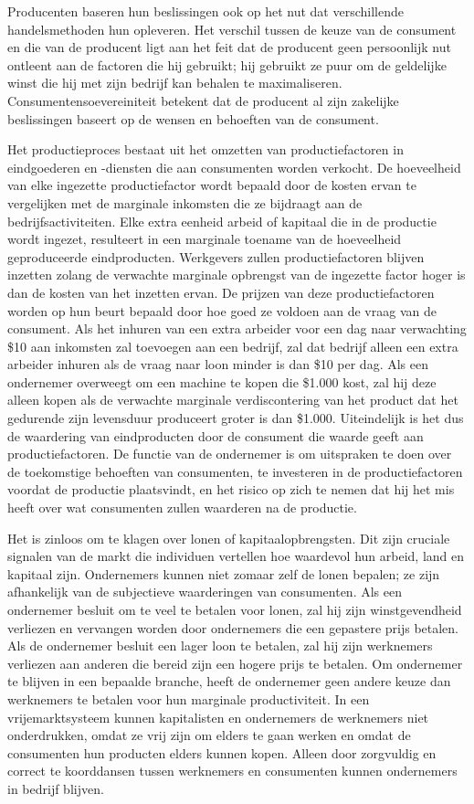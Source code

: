 \documentclass[
  a5paper,
  smalldemyvopaper,11pt,twoside,onecolumn,openright,extrafontsizes,
hidelinks]{memoir}
\begin{document}
Producenten baseren hun beslissingen ook op het nut dat verschillende
handelsmethoden hun opleveren. Het verschil tussen de keuze van de
consument en die van de producent ligt aan het feit dat de producent
geen persoonlijk nut ontleent aan de factoren die hij gebruikt; hij
gebruikt ze puur om de geldelijke winst die hij met zijn bedrijf kan
behalen te maximaliseren. Consumentensoevereiniteit betekent dat de
producent al zijn zakelijke beslissingen baseert op de wensen en
behoeften van de consument.

Het productieproces bestaat uit het omzetten van productiefactoren in
eindgoederen en -diensten die aan consumenten worden verkocht. De
hoeveelheid van elke ingezette productiefactor wordt bepaald door de
kosten ervan te vergelijken met de marginale inkomsten die ze bijdraagt
aan de bedrijfsactiviteiten. Elke extra eenheid arbeid of kapitaal die
in de productie wordt ingezet, resulteert in een marginale toename van
de hoeveelheid geproduceerde eindproducten. Werkgevers zullen
productiefactoren blijven inzetten zolang de verwachte marginale
opbrengst van de ingezette factor hoger is dan de kosten van het
inzetten ervan. De prijzen van deze productiefactoren worden op hun
beurt bepaald door hoe goed ze voldoen aan de vraag van de consument.
Als het inhuren van een extra arbeider voor een dag naar verwachting
\$10 aan inkomsten zal toevoegen aan een bedrijf, zal dat bedrijf alleen
een extra arbeider inhuren als de vraag naar loon minder is dan \$10 per
dag. Als een ondernemer overweegt om een machine te kopen die \$1.000
kost, zal hij deze alleen kopen als de verwachte marginale
verdiscontering van het product dat het gedurende zijn levensduur
produceert groter is dan \$1.000. Uiteindelijk is het dus de waardering
van eindproducten door de consument die waarde geeft aan
productiefactoren. De functie van de ondernemer is om uitspraken te doen
over de toekomstige behoeften van consumenten, te investeren in de
productiefactoren voordat de productie plaatsvindt, en het risico op
zich te nemen dat hij het mis heeft over wat consumenten zullen
waarderen na de productie.

Het is zinloos om te klagen over lonen of kapitaalopbrengsten. Dit zijn
cruciale signalen van de markt die individuen vertellen hoe waardevol
hun arbeid, land en kapitaal zijn. Ondernemers kunnen niet zomaar zelf
de lonen bepalen; ze zijn afhankelijk van de subjectieve waarderingen
van consumenten. Als een ondernemer besluit om te veel te betalen voor
lonen, zal hij zijn winstgevendheid verliezen en vervangen worden door
ondernemers die een gepastere prijs betalen. Als de ondernemer besluit
een lager loon te betalen, zal hij zijn werknemers verliezen aan anderen
die bereid zijn een hogere prijs te betalen. Om ondernemer te blijven in
een bepaalde branche, heeft de ondernemer geen andere keuze dan
werknemers te betalen voor hun marginale productiviteit. In een
vrijemarktsysteem kunnen kapitalisten en ondernemers de werknemers niet
onderdrukken, omdat ze vrij zijn om elders te gaan werken en omdat de
consumenten hun producten elders kunnen kopen. Alleen door zorgvuldig en
correct te koorddansen tussen werknemers en consumenten kunnen
ondernemers in bedrijf blijven.
\end{document}

